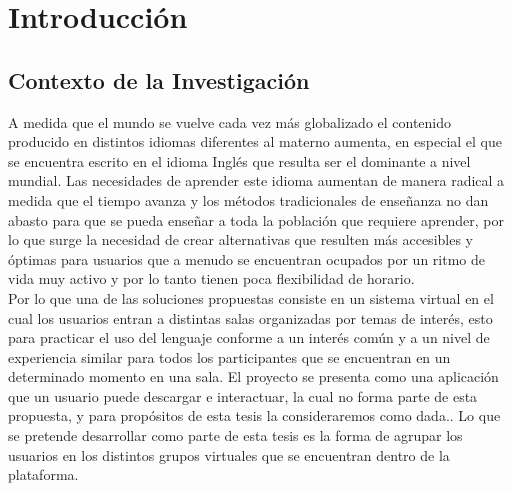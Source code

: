 \chapter{Introducción}
\label{chapter:chapter01}
\section{Contexto de la Investigación}
A medida que el mundo se vuelve cada vez más globalizado el contenido producido en distintos idiomas diferentes al materno aumenta, en especial el que se encuentra escrito en el idioma Inglés que resulta ser el dominante a nivel mundial. Las necesidades de aprender este idioma aumentan de manera radical a medida que el tiempo avanza y los métodos tradicionales de enseñanza no dan abasto para que se pueda enseñar a toda la población que requiere aprender, por lo que surge la necesidad de crear alternativas que resulten más accesibles y óptimas para usuarios que a menudo se encuentran ocupados por un ritmo de vida muy activo y por lo tanto tienen poca flexibilidad de horario.\\ 

Por lo que una de las soluciones propuestas consiste en  un sistema virtual en el cual los usuarios entran a distintas salas organizadas por temas de interés, esto para practicar el uso del lenguaje conforme a un interés común y a un nivel de experiencia similar para todos los participantes que se encuentran en un determinado momento en una sala. El proyecto se presenta como una aplicación que un usuario puede descargar e interactuar, la cual no forma parte de esta propuesta, y para propósitos de esta tesis la consideraremos como dada.. Lo que se pretende desarrollar como parte de esta tesis es la forma de agrupar  los usuarios en los distintos grupos virtuales que se encuentran dentro de la plataforma.\\ 

